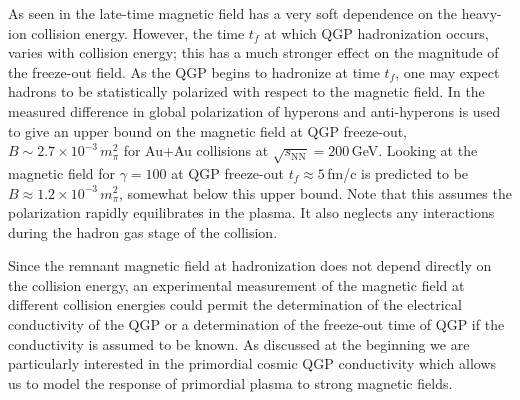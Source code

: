 As seen in  the late-time magnetic field has a very soft dependence on the heavy-ion collision energy. However, the time $t_f$ at which QGP hadronization occurs, varies with collision energy; this has a much stronger effect on the magnitude of the freeze-out field.  As the QGP begins to hadronize at time $t_f$, one may expect hadrons to be statistically polarized with respect to the magnetic field. In \cite{Muller:2018ibh} the measured difference in global polarization of hyperons and anti-hyperons is used to give an upper bound on the magnetic field at QGP freeze-out, $B \sim 2.7\times 10^{-3}\,m_{\pi}^2$ for Au+Au collisions at $\sqrt{s_\text{NN}} = 200$\,GeV. Looking at  the magnetic field for $\gamma = 100$ at QGP freeze-out $t_f \approx 5 $\,fm/c is predicted to be $B \approx 1.2\times 10^{-3}\,m_{\pi}^2$, somewhat below this upper bound. Note that this assumes the polarization rapidly equilibrates in the plasma. It also neglects any interactions during the hadron gas stage  of the collision. 

Since the remnant magnetic field at hadronization does not depend directly on the collision energy, an experimental measurement of the magnetic field at different collision energies could permit the determination of the electrical conductivity of the QGP or a determination of the freeze-out time of QGP if the conductivity is assumed to be known. As discussed at the beginning we are particularly interested in the primordial cosmic QGP conductivity which allows us to model the response of primordial plasma to strong magnetic fields. 

